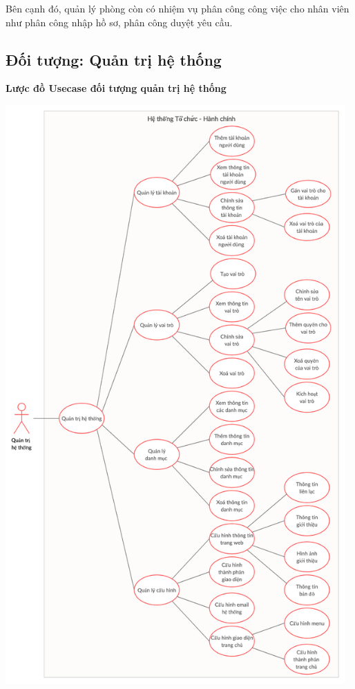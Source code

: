 Bên cạnh đó, quản lý phòng còn có nhiệm vụ phân công công việc cho nhân viên như phân công nhập hồ sơ, phân công duyệt yêu cầu.

\subsection{Đối tượng: Quản trị hệ thống}
\textbf{Lược đồ Usecase đối tượng quản trị hệ thống}
\begin{center}
  \captionsetup{type=figure}
  \includegraphics[width=13cm]{img/usecase/admin.png}
\end{center}

